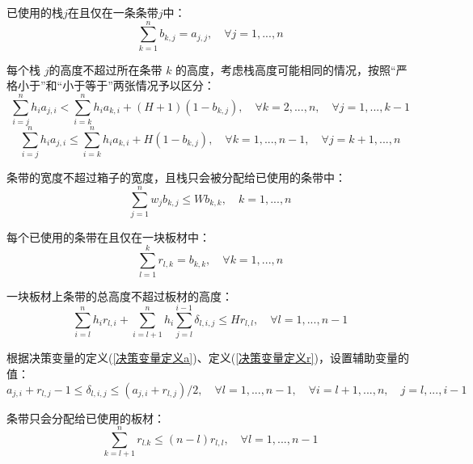 \documentclass[bwprint]{gmcmthesis}
\begin{document}
已使用的栈$j$在且仅在一条条带$j$中：
\begin{equation}
    \sum_{k=1}^{n}  b_{k,j} =a_{j,j},\quad \forall j=1,...,n  \label{栈精确排在条带}
\end{equation}

每个栈 $j$的高度不超过所在条带 $k$ 的高度，考虑栈高度可能相同的情况，按照“严格小于”和“小于等于”两张情况予以区分：
\begin{equation}
    \sum_{i=j}^{n} h_ia_{j,i}<\sum_{i=k}^n h_i a_{k,i}+(H+1)(1-b_{k,j}),\quad  \forall  k=2,...,n,\quad  \forall j=1,...,k-1 \label{严格小于的高度限制}
\end{equation}
\begin{equation}
    \sum_{i=j}^{n} h_ia_{j,i} \le \sum_{i=k}^n h_i a_{k,i}+H(1-b_{k,j}), \quad  \forall k=1,...,n-1, \quad \forall j=k+1,...,n \label{小于等于的高度限制}
\end{equation}

条带的宽度不超过箱子的宽度，且栈只会被分配给已使用的条带中：
\begin{equation}
    \sum_{j=1}^{n} w_j b_{k,j} \le W b_{k,k}, \quad k=1,...,n \label{宽度限制}
\end{equation}

每个已使用的条带在且仅在一块板材中：
\begin{equation}
    \sum_{l=1}^{k} r_{l,k} = b_{k,k}, \quad \forall k=1,...,n \label{条带精准打包}
\end{equation}

一块板材上条带的总高度不超过板材的高度：
\begin{equation}
    \sum_{i=l}^{n} h_i r_{l,i} +\sum_{i=l+1}^{n} h_i \sum_{j=l}^{i-1} \delta_{l,i,j} \le H r_{l,l}, \quad \forall l=1,...,n-1 \label{板材高度}
\end{equation}

根据决策变量的定义(\ref{决策变量定义a})、定义(\ref{决策变量定义r})，设置辅助变量的值：
\begin{equation}
    a_{j,i}+r_{l,j}-1 \le \delta_{l,i,j} \le (a_{j,i}+r_{l,j})/2, \quad \forall l=1,...,n-1,\quad \forall i=l+1,...,n,\quad j=l,...,i-1 \label{决策变量相关}
\end{equation}

条带只会分配给已使用的板材：
\begin{equation}
    \sum_{k=l+1}^{n} r_{l.k} \le (n-l)r_{l,l}, \quad \forall l=1,...,n-1 \label{未使用板材无条带}
\end{equation}
\end{document}
